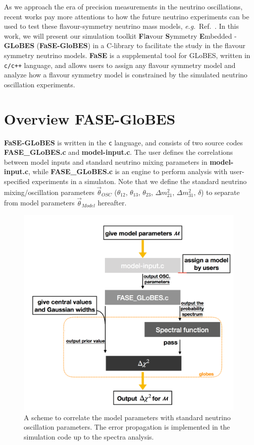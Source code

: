 \documentclass[aps,prd,nofootinbib,preprint]{revtex4}
\begin{document}
As we approach the era of precision measurements in the neutrino oscillations, recent works pay more attentions to how the future neutrino experiments can be used to test these flavour-symmetry neutrino mass models, \textit{e.g.}~Ref.~\cite{Ballett:2016yod,Chatterjee:2017xkb, Ding:2019zhn, Tang:2019edw, Blennow:2020snb}. In this work, we will present our simulation toolkit \textbf{F}l\textbf{a}vour \textbf{S}ymmetry \textbf{E}mbedded - \textbf{GLoBES} (\textbf{FaSE-GloBES}) in a C-library to facilitate the study in the flavour symmetry neutrino models. \textbf{FaSE} is a supplemental tool for GLoBES, written in \texttt{c/c++} language, and allows users to assign any flavour symmetry model and analyze how a flavour symmetry model is constrained by the simulated neutrino oscillation experiments.

\section{Overview FASE-GloBES}

\textbf{FaSE-GLoBES} is written in the \texttt{c} language, and consists of two source codes \textbf{FASE\_GLoBES.c} and \textbf{model-input.c}. The user defines the correlations between model inputs and standard neutrino mixing parameters in \textbf{model-input.c}, while \textbf{FASE\_GLoBES.c} is an engine to perform analysis with user-specified experiments in a simulaton. Note that we define the standard neutrino mixing/oscillation parameters $\vec{\theta}_{OSC}$ ($\theta_{12}$, $\theta_{13}$, $\theta_{23}$, $\Delta m_{21}^2$, $\Delta m_{31}^2$, $\delta$) to separate from model parameters $\vec{\theta}_{Model}$ hereafter.

\begin{figure}[!h]%
\centering
\includegraphics[width=4.5in]{Figs/FASE-chart_1_2.pdf}
\caption{A scheme to correlate the model parameters with standard neutrino oscillation parameters. The error propagation is implemented in the simulation code up to the spectra analysis.}%
\label{fig:FASE}
\end{figure}
\end{document}
